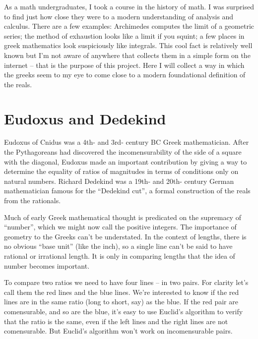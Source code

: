 As a math undergraduates, I took a course in the history of math. I was
surprised to find just how close they were to a modern understanding of
analysis and calculus. There are a few examples: Archimedes computes the limit
of a geometric series; the method of exhaustion looks like a limit if you
squint; a few places in greek mathematics look suspiciously like integrals.
This cool fact is relatively well known but I'm not aware of anywhere that
collects them in a simple form on the internet -- that is the purpose of this
project. Here I will collect a way in which the greeks seem to my eye to come
close to a modern foundational definition of the reals.

\section{Eudoxus and Dedekind}
Eudoxus of Cnidus was a 4th- and 3rd- century BC Greek mathematician. After the
Pythagoreans had discovered the incomensurability of the side of a square with
the diagonal, Eudoxus made an important contribution by giving a way to determine
the equality of ratios of magnitudes in terms of conditions only on natural
numbers. Richard Dedekind was a 19th- and 20th- century German mathematician
famous for the ``Dedekind cut'', a formal construction of the reals from the
rationals.

Much of early Greek mathematical thought is predicated on the supremacy of
``number'', which we might now call the positive integers. The importance of
geometry to the Greeks can't be understated. In the context of lengths, there
is no obvious ``base unit'' (like the inch), so a single line can't be said to
have rational or irrational length. It is only in comparing lengths that the
idea of number becomes important. 

To compare two ratios we need to have four lines -- in two pairs. For clarity
let's call them the red lines and the blue lines. We're interested to know if
the red lines are in the same ratio (long to short, say) as the blue. If the
red pair are comensurable, and so are the blue, it's easy to use Euclid's
algorithm to verify that the ratio is the same, even if the left lines and the
right lines are not comensurable. But Euclid's algorithm won't work on
incomensurable pairs.


